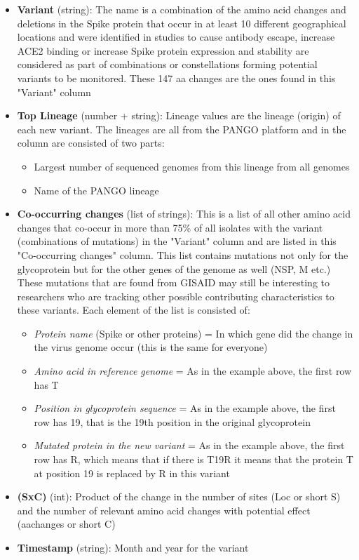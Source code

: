 \documentclass[conference,compsoc]{IEEEtran}
\begin{document}
\begin{itemize}
\item \textbf{Variant} (string): The name is a combination of the amino acid changes and deletions in the Spike protein that occur in at least 10 different geographical locations and were identified in studies to cause antibody escape, increase ACE2 binding or increase Spike protein expression and stability are considered as part of combinations or constellations forming potential variants to be monitored. These 147 aa changes are the ones found in this "Variant" column
\item \textbf{Top Lineage} (number + string): Lineage values are the lineage (origin) of each new variant. The lineages are all from the PANGO \cite{ref15} platform and in the column are consisted of two parts:
    \begin{itemize}
    \item Largest number of sequenced genomes from this lineage from all genomes 
    \item Name of the PANGO lineage
    \end{itemize}
\item \textbf{Co-occurring changes} (list of strings): This is a list of all other amino acid changes that co-occur in  more than 75\% of all isolates with the variant (combinations of mutations) in the "Variant" column and are listed in this "Co-occurring changes" column. This list contains mutations not only for the glycoprotein but for the other genes of the genome as well (NSP, M etc.) These mutations that are found from GISAID may still be interesting to researchers who are tracking other possible contributing characteristics to these variants. Each element of the list is consisted of: 
\begin{itemize}
    \item  \textit{Protein name} (Spike or other proteins) = In which gene did the change in the virus genome occur (this is the same for everyone)
    \item  \textit{Amino acid in reference genome} = As in the example above, the first row has T
    \item  \textit{Position in glycoprotein sequence} = As in the example above, the first row has 19, that is the 19th position in the original glycoprotein
    \item \textit{Mutated protein in the new variant} = As in the example above, the first row has R, which means that if there is T19R it means that the protein T at position 19 is replaced by R in this variant
\end{itemize}
\item \textbf{(SxC)} (int): Product of the change in the number of sites (Loc or short S) and the number of relevant amino acid changes with potential effect (aachanges or short C)

\item \textbf{Timestamp} (string): Month and year for the variant 
\end{itemize}
\end{document}
